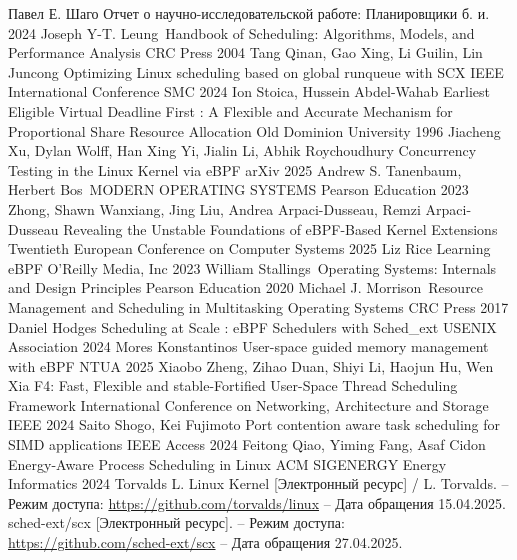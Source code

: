 \documentclass[12pt, oneside]{book}
\begin{document}
\renewcommand{\bibname}{\large СПИСОК ИСПОЛЬЗОВАННЫХ ИСТОЧНИКОВ}
\begin{thebibliography}{9}
  \vspace*{0.3cm}
  Павел Е. Шаго Отчет о научно-исследовательской работе: Планировщики б. и. 2024
  Joseph Y-T. Leung\ Handbook of Scheduling: Algorithms, Models, and
  Performance Analysis CRC Press 2004
   Tang Qinan, Gao Xing, Li Guilin, Lin Juncong Optimizing Linux
  scheduling based on global runqueue with SCX IEEE International Conference SMC 2024
  Ion Stoica, Hussein Abdel-Wahab Earliest Eligible Virtual Deadline First
  : A Flexible and Accurate Mechanism for Proportional Share Resource Allocation 
  Old Dominion University 1996
  Jiacheng Xu, Dylan Wolff, Han Xing Yi, Jialin Li, Abhik Roychoudhury 
  Concurrency Testing in the Linux Kernel via eBPF arXiv 2025
  Andrew S. Tanenbaum, Herbert Bos\ MODERN OPERATING SYSTEMS Pearson
  Education 2023
  Zhong, Shawn Wanxiang, Jing Liu, Andrea Arpaci-Dusseau, Remzi Arpaci-Dusseau
  Revealing the Unstable Foundations of eBPF-Based Kernel Extensions Twentieth
  European Conference on Computer Systems 2025
  Liz Rice Learning eBPF O’Reilly Media, Inc 2023
  William Stallings\ Operating Systems: Internals and
  Design Principles Pearson Education 2020
  Michael J. Morrison\ Resource Management and Scheduling
  in Multitasking Operating Systems CRC Press 2017
  Daniel Hodges Scheduling at Scale : eBPF Schedulers with 
  Sched\_ext USENIX Association 2024
  Mores Konstantinos User-space guided memory management with eBPF
  NTUA 2025
  Xiaobo Zheng, Zihao Duan, Shiyi Li, Haojun Hu, Wen Xia
  F4: Fast, Flexible and stable-Fortified User-Space Thread Scheduling Framework
  International Conference on Networking, Architecture and Storage IEEE 2024
  Saito Shogo, Kei Fujimoto Port contention aware task scheduling for SIMD applications
  IEEE Access 2024
  Feitong Qiao, Yiming Fang, Asaf Cidon Energy-Aware Process Scheduling in Linux
  ACM SIGENERGY Energy Informatics 2024
  Torvalds L. Linux Kernel [Электронный ресурс] / L. Torvalds.
  -- Режим доступа: \url{https://github.com/torvalds/linux} -- Дата обращения
  15.04.2025.
  sched-ext/scx [Электронный ресурс]. -- Режим доступа: \\
  \url{https://github.com/sched-ext/scx} -- Дата обращения 27.04.2025.

\end{thebibliography}
\end{document}
